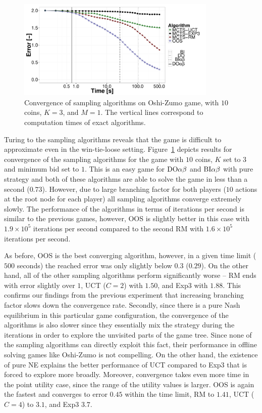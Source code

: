 \begin{figure}
\centering
\includegraphics[width=0.85\textwidth]{figures/convergence-oz.pdf}
\caption{Convergence of sampling algorithms on Oshi-Zumo game, with $10$ coins, $K=3$, and $M=1$. The vertical lines correspond to computation times of exact algorithms.} \label{fig:off:conv:oz}
\end{figure}

Turing to the sampling algorithms reveals that the game is difficult to approximate even in the win-tie-loose setting.
Figure~\ref{fig:off:conv:oz} depicts results for convergence of the sampling algorithms for the game with $10$ coins, $K$ set to $3$ and minimum bid set to $1$. This is an easy game for $\textrm{DO}\alpha\beta$ and $\textrm{BI}\alpha\beta$ with pure strategy and both of these algorithms are able to solve the game in less than a second ($0.73$). However, due to large branching factor for both players ($10$ actions at the root node for each player) all sampling algorithms converge extremely slowly. The performance of the algorithms in terms of iterations per second is similar to the previous games, however, OOS is slightly better in this case with $1.9\times10^5$ iterations per second compared to the second RM with $1.6\times10^5$ iterations per second.

As before, OOS is the best converging algorithm, however, in a given time limit ($500$ seconds) the reached error was only slightly below $0.3$ ($0.29$). On the other hand, all of the other sampling algorithms perform significantly worse -- RM ends with error slightly over $1$, UCT ($C=2$) with $1.50$, and Exp3 with $1.88$.
This confirms our findings from the previous experiment that increasing branching factor slows down the convergence rate.
Secondly, since there is a pure Nash equilibrium in this particular game configuration, the convergence of the algorithms is also slower since they essentially mix the strategy during the iterations in order to explore the unvisited parts of the game tree. Since none of the sampling algorithms can directly exploit this fact, their performance in offline solving games like Oshi-Zumo is not compelling. On the other hand, the existence of pure NE explains the better performance of UCT compared to Exp3 that is forced to explore more broadly.
Moreover, convergence takes even more time in the point utility case, since the range of the utility values is larger.
OOS is again the fastest and converges to error $0.45$ within the time limit, RM to $1.41$, UCT ($C=4$) to $3.1$, and Exp3 $3.7$. 


